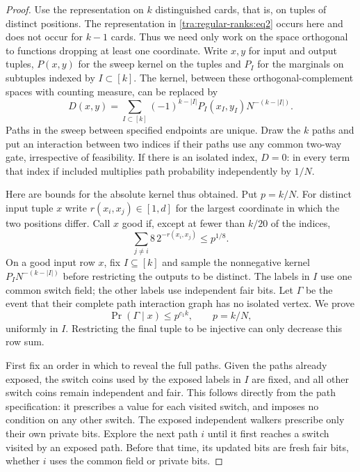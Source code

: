 \begin{proof}\label{tra:regular-ranks:sparse-proof}
\label{tra:regular-ranks:good-bad-kernel-proof}
Use the representation on \(k\) distinguished cards, that is, on tuples of distinct positions. The representation in \eqref{tra:regular-ranks:eq2} occurs here and does not occur for \(k-1\) cards. Thus we need only work on the space orthogonal to functions dropping at least one coordinate. Write \(x,y\) for input and output tuples, \(P(x,y)\) for the sweep kernel on the tuples and \(P_I\) for the marginals on subtuples indexed by \(I\subset[k]\). The kernel, between these orthogonal-complement spaces with counting measure, can be replaced by
\[
 D(x,y)=\sum_{I\subset[k]}(-1)^{k-|I|} P_I(x_I,y_I)N^{-(k-|I|)} .
\]
Paths in the sweep between specified endpoints are unique. Draw the \(k\) paths and put an interaction between two indices if their paths use any common two-way gate, irrespective of feasibility. If there is an isolated index, \(D=0\): in every term that index if included multiplies path probability independently by \(1/N\).

Here are bounds for the absolute kernel thus obtained. Put \(p=k/N\). For distinct input tuple \(x\) write \(r(x_i,x_j)\in[1,d]\) for the largest coordinate in which the two positions differ. Call \(x\) good if, except at fewer than \(k/20\) of the indices,
\begin{equation}
                       \sum_{j\ne i} 8\, 2^{-r(x_i,x_j)}
                                      \le p^{1/8}.\label{tra:regular-ranks:eq3}
\end{equation}
On a good input row $x$, fix $I\subseteq[k]$ and sample the
nonnegative kernel $P_I N^{-(k-|I|)}$ before restricting the outputs
to be distinct. The labels in $I$ use one common switch field; the
other labels use independent fair bits. Let $\Gamma$ be the event
that their complete path interaction graph has no isolated vertex.
We prove
\[
 \Pr(\Gamma\mid x)\le p^{c_1k},\qquad p=k/N,
\]
uniformly in $I$. Restricting the final tuple to be injective can
only decrease this row sum.

First fix an order in which to reveal the full paths. Given the paths
already exposed, the switch coins used by the exposed labels in $I$
are fixed, and all other
switch coins remain independent and fair. This follows directly from
the path specification: it prescribes a value for each visited switch,
and imposes no condition on any other switch. The exposed independent
walkers prescribe only their own private bits.
Explore the next path $i$ until it first reaches a switch visited by
an exposed path. Before that time, its updated bits are fresh fair
bits, whether $i$ uses the common field or private bits.


\end{proof}
